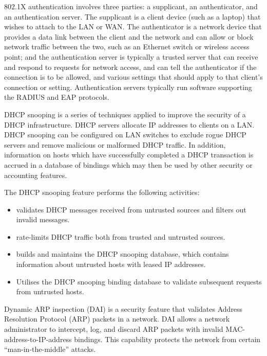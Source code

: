 {\begin{description}
   802.1X authentication involves three parties: a supplicant, an authenticator, and an authentication server.
   The supplicant is a client device (such as a laptop) that wishes to attach to the LAN or WAN.
   The authenticator is a network device that provides a data link between the client and the network and can allow or block network traffic between the two, such as an Ethernet switch or wireless access point; and the authentication server is typically a trusted server that can receive and respond to requests for network access, and can tell the authenticator if the connection is to be allowed, and various settings that should apply to that client's connection or setting.
   Authentication servers typically run software supporting the RADIUS and EAP protocols.
\item[DHCP snooping]
   DHCP snooping is a series of techniques applied to improve the security of a DHCP infrastructure.
   DHCP servers allocate IP addresses to clients on a LAN.
   DHCP snooping can be configured on LAN switches to exclude rogue DHCP servers and remove malicious or malformed DHCP traffic.
   In addition, information on hosts which have successfully completed a DHCP transaction is accrued in a database of bindings which may then be used by other security or accounting features.
   
   The DHCP snooping feature performs the following activities:
   \begin{itemize}
   \item validates DHCP messages received from untrusted sources and filters out invalid messages.
   \item rate-limits DHCP traffic both from trusted and untrusted sources.
   \item builds and maintains the DHCP snooping database, which contains information about untrusted hosts with leased IP addresses.
   \item Utilises the DHCP snooping binding database to validate subsequent requests from untrusted hosts.
   \end{itemize}
\item[dynamic ARP inspecition]
   Dynamic ARP inspection (DAI) is a security feature that validates Address Resolution Protocol (ARP) packets in a network.
   DAI allows a network administrator to intercept, log, and discard ARP packets with invalid MAC-address-to-IP-address bindings.
   This capability protects the network from certain ``man-in-the-middle'' attacks.
\end{description}
}
